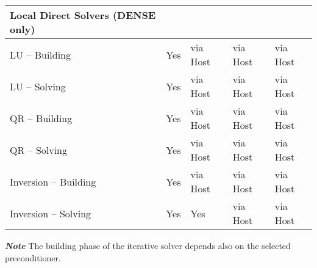 \begin{table}[H]
\begin{tabular}{l|l|l|l|l}
\textbf{Local Direct Solvers (DENSE only)} &  &       &          & \\ \hline
LU -- Building   & Yes    & via Host    & via Host     & \multicolumn{1}{l|}{via Host} \\
LU -- Solving    & Yes    & via Host    & via Host     & \multicolumn{1}{l|}{via Host} \\ \hline

QR -- Building   & Yes    & via Host    & via Host     & \multicolumn{1}{l|}{via Host} \\
QR -- Solving    & Yes    & via Host    & via Host     & \multicolumn{1}{l|}{via Host} \\ \hline

Inversion -- Building   & Yes    & via Host    & via Host     & \multicolumn{1}{l|}{via Host} \\
Inversion -- Solving    & Yes    & Yes   & via Host     & \multicolumn{1}{l|}{via Host} \\ \hline

\end{tabular}
\end{table}

\textbf{\emph{Note}} The building phase of the iterative solver depends also on the selected preconditioner.

